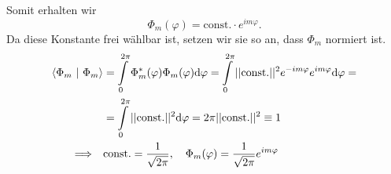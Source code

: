 \documentclass[a4paper,12pt,portrait]{book}
\numberwithin{equation}{section}
\begin{document}
Somit erhalten wir
\begin{equation*}
\Phi_m(\varphi)=\text{const.}\cdot e^{im\varphi}.
\end{equation*}
Da diese Konstante frei wählbar ist, setzen wir sie so an, dass $\Phi_m$ normiert ist.
\begin{align*}
\left\langle \Phi_m \ \middle| \ \Phi_m\right\rangle &= \int\limits_0^{2\pi}\Phi_m^*(\varphi)\Phi_m(\varphi)\mathrm{d}\varphi = 
\int\limits_0^{2\pi}||\text{const.}||^2e^{-im\varphi}e^{im\varphi}\mathrm{d}\varphi = \\
& = \int\limits_0^{2\pi}||\text{const.}||^2\mathrm{d}\varphi = 2\pi||\text{const.}||^2 \equiv 1\\
\Longrightarrow \quad &\text{const.} = \frac{1}{\sqrt{2\pi}}, \quad 
\Phi_m(\varphi) = \frac{1}{\sqrt{2\pi}}e^{im\varphi}
\end{align*}
\end{document}
